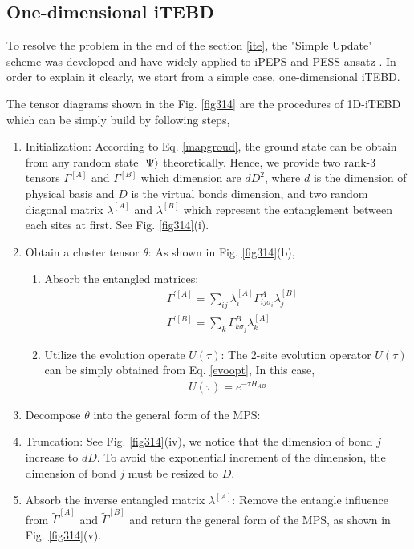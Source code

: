 \subsection{One-dimensional iTEBD}
To resolve the problem in the end of the section \ref{ite}, the "Simple Update" scheme was developed and have widely applied to iPEPS \cite{} and PESS ansatz \cite{}. In order to explain it clearly, we start from a simple case, one-dimensional iTEBD. 

The tensor diagrams shown in the Fig. \ref{fig314} are the procedures of 1D-iTEBD which can be simply build by following steps,
\begin{enumerate}
		\item Initialization: According to Eq. \ref{mapgroud}, the ground state can be obtain from any random state $\Ket{\Psi}$ theoretically. Hence, we provide two rank-3 tensors $\Gamma^{[A]}$ and $\Gamma^{[B]}$ which dimension are $dD^2$, where $d$ is the dimension of physical basis and $D$ is the virtual bonds dimension, and two random diagonal matrix $\lambda^{[A]}$ and $\lambda^{[B]}$ which represent the entanglement between each sites at first. See Fig. \ref{fig314}(i).
		\item Obtain a cluster tensor $\theta$: As shown in Fig. \ref{fig314}(b),
			\begin{enumerate}
				\item Absorb the entangled matrices; 
					\begin{align}
						&\Gamma^{\prime [A]} = \sum_{ij}{\lambda^{[A]}_{i} \Gamma^{A}_{ij \sigma_i} \lambda^{[B]}_{j}} \\
						&\Gamma^{\prime [B]} = \sum_{k}{\Gamma^{B}_{k \sigma_j} \lambda^{[A]}_{k}}
					\end{align}
						\item Utilize the evolution operate $U(\tau)$: The 2-site evolution operator $U(\tau)$ can be simply obtained from Eq. \ref{evoopt}, In this case, 
							\begin{align}
								U(\tau) = e^{-\tau H_{AB}}
							\end{align}
			\end{enumerate}
		\item Decompose $\theta$ into the general form of the MPS:
		\item Truncation: See Fig. \ref{fig314}(iv), we notice that the dimension of bond $j$ increase to $dD$. To avoid the exponential increment of the dimension, the dimension of bond $j$ must be resized to $D$.
		\item Absorb the inverse entangled matrix $\lambda^{[A]}$: Remove the entangle influence from $\widetilde{\Gamma}^{[A]}$ and $\widetilde{\Gamma}^{[B]}$ and return the general form of the MPS, as shown in Fig. \ref{fig314}(v).

\end{enumerate}
